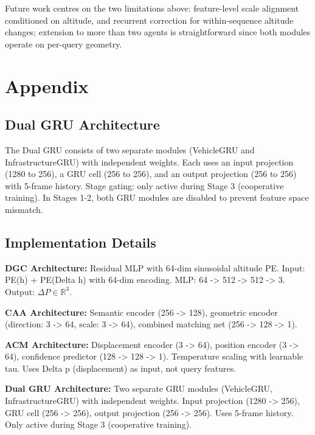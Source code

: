 \documentclass[9.5pt,twocolumn,a4paper]{IEEEtran}
\begin{document}
Future work centres on the two limitations above: feature-level scale alignment conditioned on altitude, and recurrent correction for within-sequence altitude changes; extension to more than two agents is straightforward since both modules operate on per-query geometry.




\section*{Appendix}

\subsection{Dual GRU Architecture}
\label{sec:appendix_gru}

The Dual GRU consists of two separate modules (VehicleGRU and InfrastructureGRU) with independent weights. Each uses an input projection (1280 to 256), a GRU cell (256 to 256), and an output projection (256 to 256) with 5-frame history. Stage gating: only active during Stage 3 (cooperative training). In Stages 1-2, both GRU modules are disabled to prevent feature space mismatch.

\subsection{Implementation Details}

\textbf{DGC Architecture:} Residual MLP with 64-dim sinusoidal altitude PE. Input: PE(h) + PE(Delta h) with 64-dim encoding. MLP: 64 -> 512 -> 512 -> 3. Output: $\Delta P \in \mathbb{R}^3$.

\textbf{CAA Architecture:} Semantic encoder (256 -> 128), geometric encoder (direction: 3 -> 64, scale: 3 -> 64), combined matching net (256 -> 128 -> 1).

\textbf{ACM Architecture:} Displacement encoder (3 -> 64), position encoder (3 -> 64), confidence predictor (128 -> 128 -> 1). Temperature scaling with learnable tau. Uses Delta p (displacement) as input, not query features.

\textbf{Dual GRU Architecture:} Two separate GRU modules (VehicleGRU, InfrastructureGRU) with independent weights. Input projection (1280 -> 256), GRU cell (256 -> 256), output projection (256 -> 256). Uses 5-frame history. Only active during Stage 3 (cooperative training).
\end{document}
